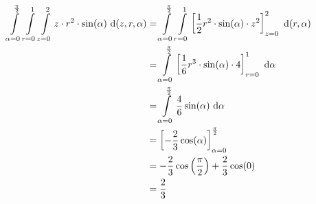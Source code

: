 \documentclass[main.tex]{subfiles}
\begin{document}
\begin{align*}
    \int \limits_{\alpha=0}^{\frac{\pi}{2}} 
	\int \limits_{r=0}^{1} 
    \int \limits_{z=0}^{2} 
        z \cdot r^2 \cdot \sin(\alpha) 
    ~\mathrm{d}(z, r, \alpha)
    &=
    \int \limits_{\alpha=0}^{\frac{\pi}{2}} 
	\int \limits_{r=0}^{1} 
        \left[ \frac{1}{2} r^2 \cdot \sin(\alpha) \cdot z^2 \right]_{z=0}^{2}  
    ~\mathrm{d}(r, \alpha) \\
    &=
    \int \limits_{\alpha=0}^{\frac{\pi}{2}} 
	\left[ 
        \frac{1}{6} r^3 \cdot \sin(\alpha) \cdot 4  
    \right]_{r=0}^{1}
    ~\mathrm{d}\alpha \\
    &=
    \int \limits_{\alpha=0}^{\frac{\pi}{2}} 
        \frac{4}{6} \sin(\alpha)  
    ~\mathrm{d}\alpha \\
    &= \left[ - \frac{2}{3} \cos(\alpha) \right]_{\alpha=0}^{\frac{\pi}{2}} \\
    &= - \frac{2}{3} \cos\left(\frac{\pi}{2}\right) + \frac{2}{3} \cos(0)  \\
    &=  \frac{2}{3} \\
\end{align*}
\end{document}
